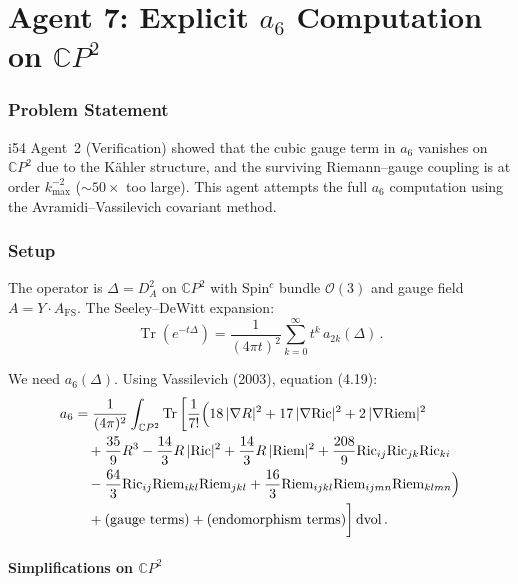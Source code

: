 \documentclass[11pt,a4paper]{article}
\newcommand{\Tr}{\operatorname{Tr}}
\newcommand{\CP}{\mathbb{C}P}
\begin{document}
\part{Agent 7: Explicit $a_6$ Computation on $\CP^2$}
\label{part:a6-explicit}

\section{Problem Statement}

i54 Agent~2 (Verification) showed that the cubic gauge term in $a_6$ vanishes on $\CP^2$ due to the K\"ahler structure, and the surviving Riemann--gauge coupling is at order $k_{\max}^{-2}$ ($\sim 50\times$ too large). This agent attempts the full $a_6$ computation using the Avramidi--Vassilevich covariant method.

\section{Setup}

The operator is $\Delta = D_A^2$ on $\CP^2$ with Spin$^c$ bundle $\mathcal{O}(3)$ and gauge field $A = Y \cdot A_{\mathrm{FS}}$. The Seeley--DeWitt expansion:
\begin{equation}
\Tr(e^{-t\Delta}) = \frac{1}{(4\pi t)^2}\sum_{k=0}^{\infty} t^k\,a_{2k}(\Delta)\,.
\end{equation}

We need $a_6(\Delta)$. Using Vassilevich (2003), equation (4.19):
\begin{align}
a_6 &= \frac{1}{(4\pi)^2}\int_{\CP^2} \Tr\bigg[\frac{1}{7!}\Big(18\,|\nabla R|^2 + 17\,|\nabla\mathrm{Ric}|^2 + 2\,|\nabla\mathrm{Riem}|^2 \notag\\
&\quad + \frac{35}{9}R^3 - \frac{14}{3}R\,|\mathrm{Ric}|^2 + \frac{14}{3}R\,|\mathrm{Riem}|^2 + \frac{208}{9}\mathrm{Ric}_{ij}\mathrm{Ric}_{jk}\mathrm{Ric}_{ki} \notag\\
&\quad - \frac{64}{3}\mathrm{Ric}_{ij}\mathrm{Riem}_{ikl}\mathrm{Riem}_{jkl} + \frac{16}{3}\mathrm{Riem}_{ijkl}\mathrm{Riem}_{ijmn}\mathrm{Riem}_{klmn}\Big) \notag\\
&\quad + \text{(gauge terms)} + \text{(endomorphism terms)}\bigg]\,\mathrm{dvol}\,.
\end{align}

\subsection{Simplifications on $\CP^2$}
\end{document}

